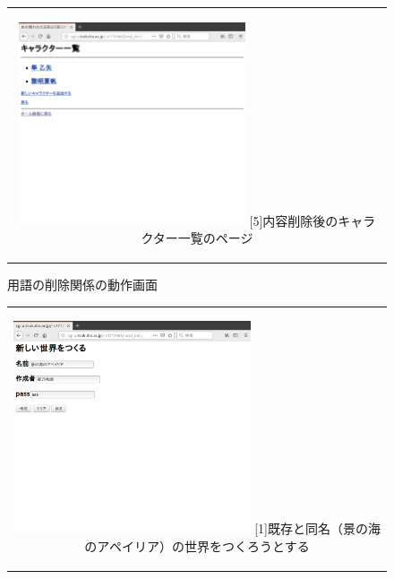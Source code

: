 \documentclass[12pt,a4paper]{jarticle}
\begin{document}
\begin{ttfamily}
\begin{figure}[htbp]
\begin{center}
\begin{tabular}{c}
      \begin{minipage}{0.55\hsize}
        \begin{center}
          \includegraphics[width=6.7cm]{10-3-34.eps}
          \hspace{1.6cm} [5]内容削除後のキャラクター一覧のページ
        \end{center}
      \end{minipage}

    \end{tabular}
    \caption{用語の削除関係の動作画面}
    \label{fig:b}
  \end{center}
\end{figure}

\begin{figure}[htbp]
  \begin{center}
    \begin{tabular}{c}

      \begin{minipage}{0.55\hsize}
        \begin{center}
          \includegraphics[width=7.0cm]{10-3-37.eps}
          \hspace{1.6cm} [1]既存と同名（景の海のアペイリア）の世界をつくろうとする
        \end{center}
      \end{minipage}


\end{tabular}
\end{center}
\end{figure}
\end{ttfamily}
\end{document}
